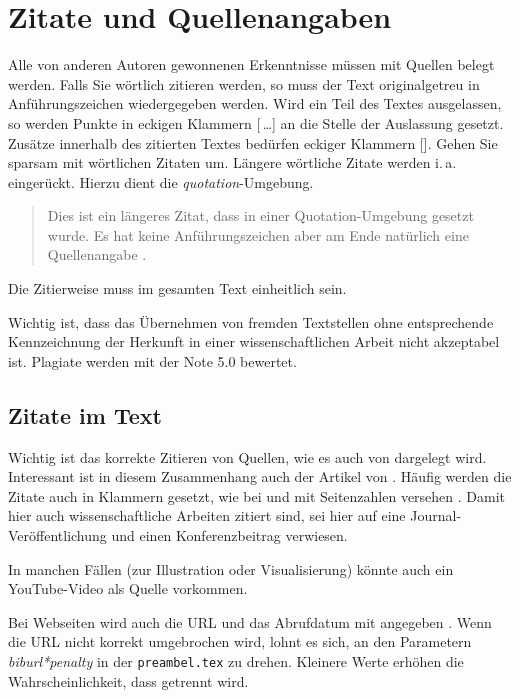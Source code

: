 \documentclass[conference,compsoc,final,a4paper]{IEEEtran}
\begin{document}
\section{Zitate und Quellenangaben}\label{quellen}
Alle von anderen Autoren gewonnenen Erkenntnisse müssen mit Quellen belegt werden. Falls Sie wörtlich zitieren werden, so muss der Text originalgetreu in Anführungszeichen wiedergegeben werden. Wird ein Teil des Textes ausgelassen, so werden Punkte in eckigen Klammern [\,\dots] an die Stelle der Auslassung gesetzt. Zusätze innerhalb des zitierten Textes bedürfen eckiger Klammern []. Gehen Sie sparsam mit wörtlichen Zitaten um. Längere wörtliche Zitate werden i.\,a. eingerückt. Hierzu dient die \textit{quotation}-Umgebung.

\begin{quotation}
Dies ist ein längeres Zitat, dass in einer Quotation-Umgebung gesetzt wurde. Es hat keine Anführungszeichen aber am Ende natürlich eine Quellenangabe \cite{Kornmeier2011}.
\end{quotation}

Die Zitierweise muss im gesamten Text einheitlich sein.

Wichtig ist, dass das Übernehmen von fremden Textstellen ohne entsprechende Kennzeichnung der Herkunft in einer wissenschaftlichen Arbeit nicht akzeptabel ist. Plagiate werden mit der Note 5.0 bewertet.

\subsection{Zitate im Text}
Wichtig ist das korrekte Zitieren von Quellen, wie es auch von \cite{Kornmeier2011} dargelegt wird. Interessant ist in diesem Zusammenhang auch der Artikel von \cite{Kramer2009}. Häufig werden die Zitate auch in Klammern gesetzt, wie bei \parencite{Kornmeier2011} und mit Seitenzahlen versehen \parencite[S. 22--24]{Kornmeier2011}.
Damit hier auch wissenschaftliche Arbeiten zitiert sind, sei hier auf eine Journal-Veröffentlichung \cite{Christidis2016} und einen Konferenzbeitrag \cite{Redmon2016} verwiesen.

In manchen Fällen (zur Illustration oder Visualisierung) könnte auch ein YouTube-Video\autocite{gronkh2019} als Quelle vorkommen.

Bei Webseiten wird auch die URL und das Abrufdatum mit angegeben \parencite{Gao2017}. Wenn die URL nicht korrekt umgebrochen wird, lohnt es sich, an den Parametern \textit{biburl*penalty} in der \texttt{preambel.tex} zu drehen. Kleinere Werte erhöhen die Wahrscheinlichkeit, dass getrennt wird.
\end{document}
